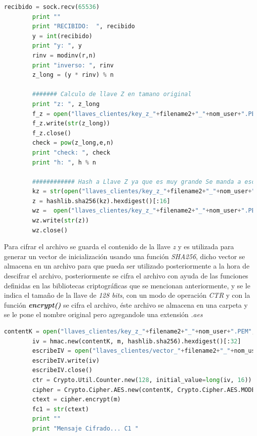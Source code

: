 \begin{lstlisting}[language=Python,frame=single, keywordstyle=\color{blue},breaklines=true, showstringspaces=false]
        recibido = sock.recv(65536)
        print ""
        print "RECIBIDO:  ", recibido
        y = int(recibido)
        print "y: ", y
        rinv = modinv(r,n)
        print "inverso: ", rinv
        z_long = (y * rinv) % n  

        ####### Calculo de llave Z en tamano original
        print "z: ", z_long
        f_z = open("llaves_clientes/key_z_"+filename2+"_"+nom_user+".PEM", "w")
        f_z.write(str(z_long))
        f_z.close()
        check = pow(z_long,e,n)
        print "check: ", check
        print "h: ", h % n

        ############ Hash a Llave Z ya que es muy grande Se manda a escribir de nuevo al archivo
        kz = str(open("llaves_clientes/key_z_"+filename2+"_"+nom_user+".PEM", "rb").read())
        z = hashlib.sha256(kz).hexdigest()[:16]
        wz =  open("llaves_clientes/key_z_"+filename2+"_"+nom_user+".PEM", "w")
        wz.write(str(z))
        wz.close()
\end{lstlisting}

Para cifrar el archivo se guarda el contenido de la llave \textit{z} y es utilizada para generar un vector de inicialización usando una función \textit{SHA256}, dicho vector se almacena en un archivo para que pueda ser utilizado posteriormente a la hora de descifrar el archivo, posteriormente se cifra el archivo con ayuda de las funciones definidas en las bibliotecas criptográficas que se mencionan anteriormente, y se le indica el tamaño de la llave de \textit{128 bits}, con un modo de operación \textit{CTR} y con la función \textbf{\textit{encrypt()}} se cifra el archivo, éste archivo se almacena en una carpeta y se le pone el nombre original pero agregandole una  extensión \textit{.aes}

\begin{lstlisting}[language=Python,frame=single, keywordstyle=\color{blue},breaklines=true, showstringspaces=false]
        contentK = open("llaves_clientes/key_z_"+filename2+"_"+nom_user+".PEM", "rb").read()
        iv = hmac.new(contentK, m, hashlib.sha256).hexdigest()[:32]  
        escribeIV = open("llaves_clientes/vector_"+filename2+"_"+nom_user+".txt","wb")
        escribeIV.write(iv)
        escribeIV.close()
        ctr = Crypto.Util.Counter.new(128, initial_value=long(iv, 16))
        cipher = Crypto.Cipher.AES.new(contentK, Crypto.Cipher.AES.MODE_CTR, counter=ctr)
        ctext = cipher.encrypt(m)
        fc1 = str(ctext)
        print ""
        print "Mensaje Cifrado... C1 "
\end{lstlisting}

